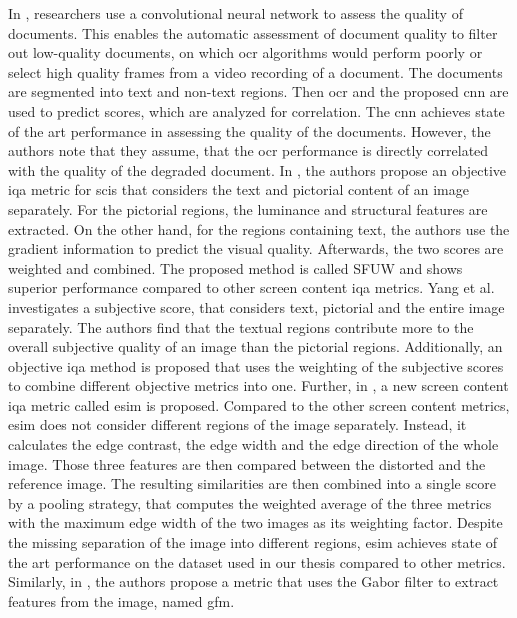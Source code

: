 In \cite{ocr_cnn_docu_2014}, researchers use a convolutional neural network to assess the quality of documents.
This enables the automatic assessment of document quality to filter out low-quality documents, on which \gls{ocr} algorithms would perform poorly or select high quality frames from a video recording of a document.
The documents are segmented into text and non-text regions.
Then \gls{ocr} and the proposed \gls{cnn} are used to predict scores, which are analyzed for correlation.
The \gls{cnn} achieves state of the art performance in assessing the quality of the documents.
However, the authors note that they assume, that the \gls{ocr} performance is directly correlated with the quality of the degraded document.
In \cite{text_pict_weight_2017}, the authors propose an objective \gls{iqa} metric for \glspl{sci} that considers the text and pictorial content of an image separately.
For the pictorial regions, the luminance and structural features are extracted.
On the other hand, for the regions containing text, the authors use the gradient information to predict the visual quality.
Afterwards, the two scores are weighted and combined.
The proposed method is called SFUW and shows superior performance compared to other screen content \gls{iqa} metrics.
Yang et al. \cite{3_subj_weight_2015} investigates a subjective score, that considers text, pictorial and the entire image separately.
The authors find that the textual regions contribute more to the overall subjective quality of an image than the pictorial regions.
Additionally, an objective \gls{iqa} method is proposed that uses the weighting of the subjective scores to combine different objective metrics into one.
Further, in \cite{ni_esim_2017}, a new screen content \gls{iqa} metric called \gls{esim} is proposed.
Compared to the other screen content metrics, \gls{esim} does not consider different regions of the image separately.
Instead, it calculates the edge contrast, the edge width and the edge direction of the whole image.
Those three features are then compared between the distorted and the reference image.
The resulting similarities are then combined into a single score by a pooling strategy, that computes the weighted average of the three metrics with the maximum edge width of the two images as its weighting factor.
Despite the missing separation of the image into different regions, \gls{esim} achieves state of the art performance on the dataset used in our thesis compared to other metrics.
Similarly, in \cite{iqa_sci_gabor_2018}, the authors propose a metric that uses the Gabor filter to extract features from the image, named \gls{gfm}.
